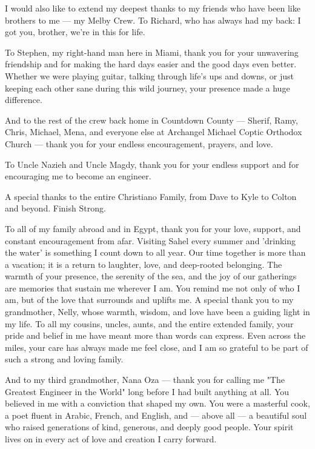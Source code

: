 \begin{dissacknowledgments}
I would also like to extend my deepest thanks to my friends who have been like brothers to me --- my Melby Crew. To Richard, who has always had my back: I got you, brother, we're in this for life.

To Stephen, my right-hand man here in Miami, thank you for your unwavering friendship and for making the hard days easier and the good days even better. Whether we were playing guitar, talking through life's ups and downs, or just keeping each other sane during this wild journey, your presence made a huge difference.
    
And to the rest of the crew back home in Countdown County --- Sherif, Ramy, Chris, Michael, Mena, and everyone else at Archangel Michael Coptic Orthodox Church --- thank you for your endless encouragement, prayers, and love. 

To Uncle Nazieh and Uncle Magdy, thank you for your endless support and for encouraging me to become an engineer. 

A special thanks to the entire Christiano Family, from Dave to Kyle to Colton and beyond. Finish Strong. 

To all of my family abroad and in Egypt, thank you for your love, support, and constant encouragement from afar. Visiting Sahel every summer and 'drinking the water' is something I count down to all year. Our time together is more than a vacation; it is a return to laughter, love, and deep-rooted belonging. The warmth of your presence, the serenity of the sea, and the joy of our gatherings are memories that sustain me wherever I am. You remind me not only of who I am, but of the love that surrounds and uplifts me. A special thank you to my grandmother, Nelly, whose warmth, wisdom, and love have been a guiding light in my life. To all my cousins, uncles, aunts, and the entire extended family, your pride and belief in me have meant more than words can express. Even across the miles, your care has always made me feel close, and I am so grateful to be part of such a strong and loving family.

And to my third grandmother, Nana Oza --- thank you for calling me "The Greatest Engineer in the World" long before I had built anything at all. You believed in me with a conviction that shaped my own. You were a masterful cook, a poet fluent in Arabic, French, and English, and --- above all --- a beautiful soul who raised generations of kind, generous, and deeply good people. Your spirit lives on in every act of love and creation I carry forward.


\end{dissacknowledgments}
